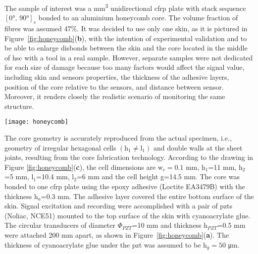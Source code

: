 \documentclass[a4paper,fleqn]{cas-dc}
\begin{document}
The sample of interest was a  \unit{\cubic\mm} unidirectional \ac{cfrp} plate with stack sequence \(\left[\ang{0},\,\ang{90}\right]_s\) bonded to an aluminium honeycomb core.
The volume fraction of fibres was assumed 47\%.
It was decided to use only one skin, as it is pictured in Figure~\ref{fig:honeycomb}(\textbf{b}), with the intention of experimental validation and to be able to enlarge disbonds between the skin and the core located in the middle of \ac{hsc} with a tool in a real sample. 
However, separate samples were not dedicated for each size of damage because too many factors would affect the signal value, including skin and sensors properties, the thickness of the adhesive layers, position of the core relative to the sensors, and distance between sensor.
Moreover, it renders closely the realistic scenario of monitoring the same structure.
\begin{figure*}
	\begin{center}
		\texttt{[image: honeycomb]}
	\end{center}
	\caption{Sample configuration: (\textbf{a}) top view of the sample, (\textbf{b}) \acl{hsc} and (\textbf{c}) details of the honeycomb cell}
	\label{fig:honeycomb}
\end{figure*}

The core geometry is accurately reproduced from the actual specimen, i.e., geometry of irregular hexagonal cells \(\left(\mathrm{h}_1 \ne \mathrm{l}_1\right)\) and double walls at the sheet joints, resulting from the core fabrication technology.
According to the drawing in Figure \ref{fig:honeycomb}(\textbf{c}), the cell dimensions are \(\mathrm{w}_c=0.1\) \unit{\mm}, h\(_1\)=11 \unit{\mm}, h\(_2\)=5 \unit{\mm}, l\(_1\)=10.4 \unit{\mm}, l\(_2\)=6 \unit{\mm} and the cell height g=14.5 \unit{\mm}.
The core was bonded to one \ac{cfrp} plate using the epoxy adhesive (Loctite EA3479B) with the thickness h\(_a\)=0.3 \unit{\mm}.
The adhesive layer covered the entire bottom surface of the skin.
Signal excitation and recording were accomplished with a pair of \acp{pzt}  (Noliac, NCE51) mounted to the top surface of the skin with cyanoacrylate glue.
The circular transducers of diameter \(\Phi_{PZT}\)=10 \unit{\mm} and thickness h\(_{PZT}\)=0.5 \unit{\mm} were attached 200 \unit{\mm} apart, as shown in Figure~\ref{fig:honeycomb}(\textbf{a}).
The thickness of cyanoacrylate glue under the \ac{pzt} was assumed to be h\(_g=50\) \unit{\micro\m}.
\end{document}
